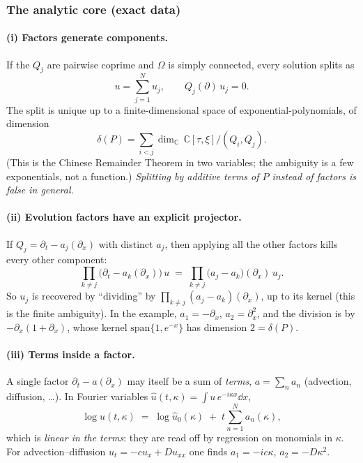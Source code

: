 \subsubsection{The analytic core (exact data)}\label{sec:core}

\paragraph{(i) Factors generate components.}
If the $Q_j$ are pairwise coprime and $\Omega$ is simply connected, every solution splits as
\[
u=\sum_{j=1}^{N}u_j,\qquad Q_j(\partial)\,u_j=0 .
\]
The split is unique up to a finite-dimensional space of exponential-polynomials, of dimension
\[
\delta(P)=\sum_{i<j}\dim_{\mathbb C}\,\mathbb C[\tau,\xi]\big/(Q_i,Q_j).
\]
(This is the Chinese Remainder Theorem in two variables; the ambiguity is a few exponentials, not a function.) \emph{Splitting by additive terms of $P$ instead of factors is false in general.}

\paragraph{(ii) Evolution factors have an explicit projector.}
If $Q_j=\partial_t-a_j(\partial_x)$ with distinct $a_j$, then applying all the other factors kills every other component:
\[
\prod_{k\ne j}\big(\partial_t-a_k(\partial_x)\big)\,u\;=\;\prod_{k\ne j}\big(a_j-a_k\big)(\partial_x)\,u_j .
\]
So $u_j$ is recovered by ``dividing'' by $\prod_{k\ne j}(a_j-a_k)(\partial_x)$, up to its kernel (this is the finite ambiguity). In the example, $a_1=-\partial_x$, $a_2=\partial_x^2$, and the division is by $-\partial_x(1+\partial_x)$, whose kernel $\mathrm{span}\{1,e^{-x}\}$ has dimension $2=\delta(P)$.

\paragraph{(iii) Terms inside a factor.}
A single factor $\partial_t-a(\partial_x)$ may itself be a sum of \emph{terms}, $a=\sum_n a_n$ (advection, diffusion, \dots). In Fourier variables $\hat u(t,\kappa)=\int u\,e^{-i\kappa x}\dd x$,
\[
\log\hat u(t,\kappa)\;=\;\log\hat u_0(\kappa)\;+\;t\sum_{n=1}^{N} a_n(\kappa),
\]
which is \emph{linear in the terms}: they are read off by regression on monomials in $\kappa$. For advection--diffusion $u_t=-cu_x+Du_{xx}$ one finds $a_1=-ic\kappa$, $a_2=-D\kappa^2$.

